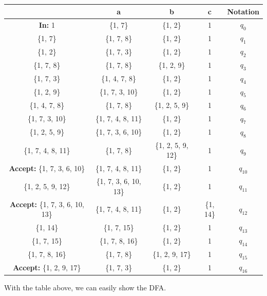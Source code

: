 \documentclass[12pt]{article}
\begin{document}
\begin{center}
  \begin{tabular}{|c|c|c|c|c|}
    \hline
     & a & b & c & Notation\\
    \hline
    \textbf{In:} 1 & \{1, 7\} & \{1, 2\} & 1 & $q_0$ \\
    \hline
    \{1, 7\} & \{1, 7, 8\} & \{1, 2\} & 1 & $q_1$ \\
    \hline
    \{1, 2\} & \{1, 7, 3\} & \{1, 2\} & 1 & $q_2$ \\
    \hline
    \{1, 7, 8\} & \{1, 7, 8\} & \{1, 2, 9\} & 1 & $q_3$ \\
    \hline
    \{1, 7, 3\} & \{1, 4, 7, 8\} & \{1, 2\} & 1 & $q_4$ \\
    \hline
    \{1, 2, 9\} & \{1, 7, 3, 10\} & \{1, 2\} & 1 & $q_5$ \\
    \hline
    \{1, 4, 7, 8\} & \{1, 7, 8\} & \{1, 2, 5, 9\} & 1 & $q_6$ \\
    \hline
    \{1, 7, 3, 10\} & \{1, 7, 4, 8, 11\} & \{1, 2\} & 1 & $q_7$ \\
    \hline
    \{1, 2, 5, 9\} & \{1, 7, 3, 6, 10\} & \{1, 2\} & 1 & $q_8$ \\
    \hline
    \{1, 7, 4, 8, 11\} & \{1, 7, 8\} & \{1, 2, 5, 9, 12\} & 1 & $q_9$ \\
    \hline
    \textbf{Accept:} \{1, 7, 3, 6, 10\} & \{1, 7, 4, 8, 11\} & \{1, 2\} & 1 & $q_{10}$ \\
    \hline
    \{1, 2, 5, 9, 12\} & \{1, 7, 3, 6, 10, 13\} & \{1, 2\} & 1 & $q_{11}$ \\
    \hline
    \textbf{Accept:} \{1, 7, 3, 6, 10, 13\} & \{1, 7, 4, 8, 11\} & \{1, 2\} & \{1, 14\} & $q_{12}$ \\
    \hline
    \{1, 14\} & \{1, 7, 15\} & \{1, 2\} & 1 & $q_{13}$ \\
    \hline
    \{1, 7, 15\} & \{1, 7, 8, 16\} & \{1, 2\} & 1 & $q_{14}$ \\
    \hline
    \{1, 7, 8, 16\} & \{1, 7, 8\} & \{1, 2, 9, 17\} & 1 & $q_{15}$ \\
    \hline
    \textbf{Accept:} \{1, 2, 9, 17\} & \{1, 7, 3\} & \{1, 2\} & 1 & $q_{16}$ \\
    \hline
  \end{tabular}
\end{center}

With the table above, we can easily show the DFA.
\end{document}

